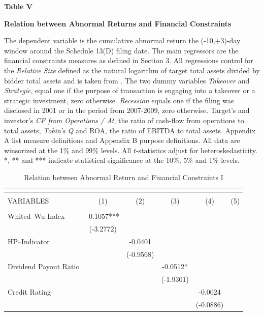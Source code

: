 \documentclass[12pt]{article}
\begin{document}
\begin{table}[!htbp]
	\centering
	\captionsetup{textformat=empty,labelformat=blank}
	\caption{Relation between Abnormal Return and Financial Constraints I}
	\textbf{Table V}\par\medskip
	\large\textbf{Relation between Abnormal Returns and Financial Constraints}\par\medskip
	\justifying
	\footnotesize\noindent{} The dependent variable is the cumulative abnormal return the (-10,+3)-day window around the Schedule 13(D) filing date. The main regressors are the financial constraints measures as defined in Section 3. All regressions control for the \emph{Relative Size} defined as the natural logarithm of target total assets divided by bidder total assets and is taken from \citet[p.112]{Khatami2014}. The two dummy variables \emph{Takeover} and \emph{Strategic}, equal one if the purpose of transaction is engaging into a takeover or a strategic investment, zero otherwise. \emph{Recession} equals one if the filing was disclosed in 2001 or in the period from 2007-2009, zero otherwise. Target's and investor's \emph{CF from Operations / At}, the ratio of cash-flow from operations to total assets, \emph{Tobin's Q} and ROA, the ratio of EBITDA to total assets. Appendix A list measure definitions and Appendix B purpose definitions. All data are winsorized at the 1\% and 99\% levels. All $t$-statistics adjust for heteroskedasticity. *, ** and *** indicate statistical significance at the 10\%, 5\% and 1\% levels.\par\medskip									
	\begin{adjustbox}{max width=\textwidth}
		\begin{tabular}{lccccc}
			\multicolumn{6}{c}{} \\ \hline
			\\
			VARIABLES & (1) &(2) & (3)& (4) & (5)\\ \hline
			 &  &  &  &  &  \\
			Whited--Wu Index & -0.1057*** &  &  &  &  \\
			 & (-3.2772) &  &  &  &  \\
			HP--Indicator &  & -0.0401 &  &  &  \\
			 &  & (-0.9568) &  &  &  \\
			Dividend Payout Ratio &  &  & -0.0512* &  &  \\
			 &  &  & (-1.9301) &  &  \\
			Credit Rating &  &  &  & -0.0024 &  \\
			 &  &  &  & (-0.0886) &  \\

\end{tabular}
\end{adjustbox}
\end{table}
\end{document}
